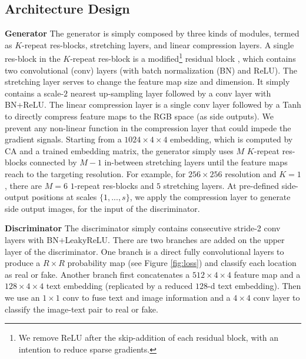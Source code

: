 \documentclass[10pt,twocolumn,letterpaper]{article}
\begin{document}
\subsection{Architecture Design}

\textbf{Generator} The generator is simply composed by three kinds of modules, termed as $K$-repeat res-blocks, stretching layers, and linear compression layers.
A single res-block in the $K$-repeat res-block is a modified\footnote{We remove ReLU after the skip-addition of each residual block, with an intention to reduce sparse gradients.} residual block \cite{he2016identity}, which contains two convolutional (conv) layers (with batch normalization (BN) \cite{ioffe2015batch} and ReLU). The stretching layer serves to change the feature map size and dimension. It simply contains a scale-$2$ nearest up-sampling layer followed by a conv layer with BN+ReLU. The linear compression layer is a single conv layer followed by a Tanh to directly compress feature maps to the RGB space (as side outputs). We prevent any non-linear function in the compression layer that could impede the gradient signals. 
Starting from a $1024{\times}4{\times}4$ embedding, which is computed by CA and a trained embedding matrix, the generator simply uses $M$ $K$-repeat res-blocks connected by $M{-}1$ in-between stretching layers until the feature maps reach to the targeting resolution. 
For example, for $256{\times}256$ resolution and $K{=}1$, there are $M{=}6$ $1$-repeat res-blocks and $5$ stretching layers. 
At pre-defined side-output positions at scales $\{1,...,s\}$, we apply the compression layer to generate side output images, for the input of the discriminator. 

\textbf{Discriminator} The discriminator simply contains consecutive stride-2 conv layers with BN+LeakyReLU. There are two branches are added on the upper layer of the discriminator. One branch is a direct fully convolutional layers to produce a $R{\times}R$ probability map (see Figure \ref{fig:loss}) and classify each location as real or fake. 
Another branch first concatenates a $512{\times}4{\times}4$ feature map and a $128{\times}4{\times}4$ text embedding (replicated by a reduced $128$-d text embedding). Then we use an $1{\times}1$ conv to fuse text and image information and a $4{\times}4$ conv layer to classify the image-text pair to real or fake.
\end{document}
